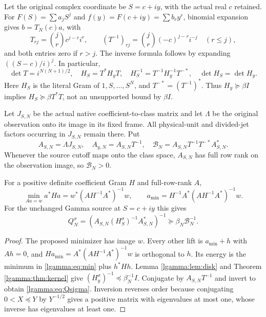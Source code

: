 Let the original complex coordinate be $S=c+iy$, with the actual real
$c$ retained.  For $F(S)=\sum a_jS^j$ and $f(y)=F(c+iy)=\sum b_ry^r$,
binomial expansion gives $b=T_N(c)a$, with
\begin{equation}\label{lgamma:eq:T}
 T_{rj}=\binom jr c^{j-r}i^r,\qquad
 (T^{-1})_{rj}=\binom jr(-c)^{j-r}i^{-j}\quad(r\le j),
\end{equation}
and both entries zero if $r>j$.  The inverse formula follows by
expanding $((S-c)/i)^j$.  In particular,
\begin{equation}\label{lgamma:eq:Tgram}
 \det T=i^{N(N+1)/2},\quad H_S=T^*H_yT,\quad
 H_S^{-1}=T^{-1}H_y^{-1}T^{-*},\quad \det H_S=\det H_y.
\end{equation}
Here $H_S$ is the literal Gram of $1,S,\ldots,S^N$, and
$T^{-*}=(T^{-1})^*$.  Thus $H_y\succeq\beta I$ implies
$H_S\succeq\beta T^*T$, not an unsupported bound by $\beta I$.

Let $J_{S,N}$ be the actual native coefficient-to-class matrix and let
$\Lambda$ be the original observation onto its image in its fixed frame.
All physical-unit and divided-jet factors occurring in $J_{S,N}$ remain
there.  Put
\begin{equation}\label{lgamma:eq:A}
 A_{S,N}=\Lambda J_{S,N},\quad
 A_{y,N}=A_{S,N}T^{-1},\quad
 \mathcal B_N=A_{S,N}T^{-1}T^{-*}A_{S,N}^*.
\end{equation}
Whenever the source cutoff maps onto the class space, $A_{S,N}$ has full
row rank on the observation image, so $\mathcal B_N>0$.

\begin{lgammalemma}\label{lgamma:lem:min}
For a positive definite coefficient Gram $H$ and full-row-rank $A$,
\begin{equation}\label{lgamma:eq:min}
 \min_{Aa=w}a^*Ha=w^*(AH^{-1}A^*)^{-1}w,\qquad
 a_{\min}=H^{-1}A^*(AH^{-1}A^*)^{-1}w.
\end{equation}
For the unchanged Gamma source at $S=c+iy$ this gives
\begin{equation}\label{lgamma:eq:Qsigma}
 \boxed{Q_N^\sigma=(A_{S,N}(H_S^\sigma)^{-1}A_{S,N}^*)^{-1}
 \succeq\beta_N\mathcal B_N^{-1}.}
\end{equation}
\end{lgammalemma}
\begin{proof}
The proposed minimizer has image $w$.  Every other lift is $a_{\min}+h$
with $Ah=0$, and $Ha_{\min}=A^*(AH^{-1}A^*)^{-1}w$ is orthogonal
to $h$.  Its energy is the minimum in \eqref{lgamma:eq:min} plus $h^*Hh$.
Lemma \ref{lgamma:lem:disk} and Theorem \ref{lgamma:thm:kernel} give
$(H_y^\sigma)^{-1}\preceq\beta_N^{-1}I$.  Conjugate by
$A_{S,N}T^{-1}$ and invert to obtain \eqref{lgamma:eq:Qsigma}.  Inversion
reverses order because conjugating $0<X\preceq Y$ by $Y^{-1/2}$
gives a positive matrix with eigenvalues at most one, whose inverse has
eigenvalues at least one.
\end{proof}

